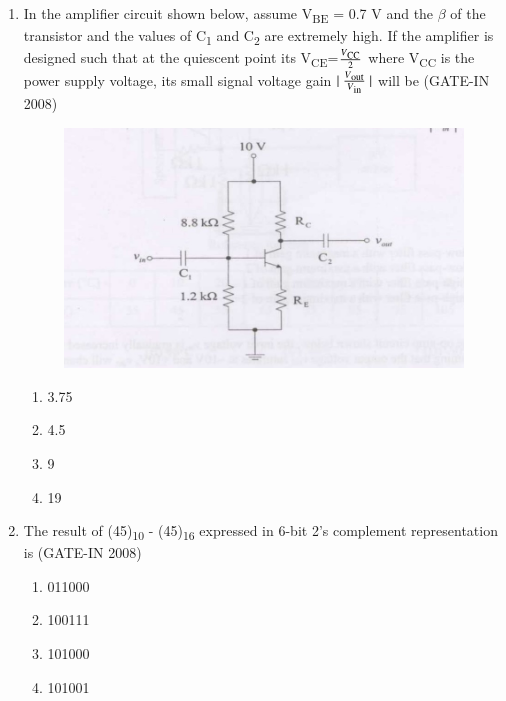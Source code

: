 \documentclass[journal,12pt,onecolumn]{IEEEtran}
\theoremstyle{remark}
\begin{document}
\begin{enumerate}
    \item  In the amplifier circuit shown below, assume V\textsubscript{BE} = 0.7 V and the $\beta$ of the transistor and the values
of C\textsubscript{1} and C\textsubscript{2} are extremely high. If the amplifier is designed such that at the quiescent point its V\textsubscript{CE}=\(\frac{V\textsubscript{CC}}{2}\) where V\textsubscript{CC}  is the power supply voltage, its small signal voltage gain $\lvert \ \frac{V\textsubscript{out}}{V\textsubscript{in}}\  \rvert$ will be \hfill (GATE-IN 2008)
\begin{figure}[H]
    \centering
    \includegraphics[width=0.5\columnwidth]{figs/i22.jpg}
    \caption{}
    \label{fig:placeholder22}
\end{figure}
\begin{multicols}{4}
    \begin{enumerate} 
        \item 3.75
        \item  4.5
        \item  9
        \item 19
    \end{enumerate}
    \end{multicols}
    
    \item The result of (45)\textsubscript{10} - (45)\textsubscript{16} expressed in 6-bit 2's complement representation is \hfill (GATE-IN 2008)
    \begin{multicols}{4}
    \begin{enumerate} 
        \item 011000
        \item 100111
        \item 101000
        \item 101001
    \end{enumerate}
    \end{multicols}
    

\end{enumerate}
\end{document}
